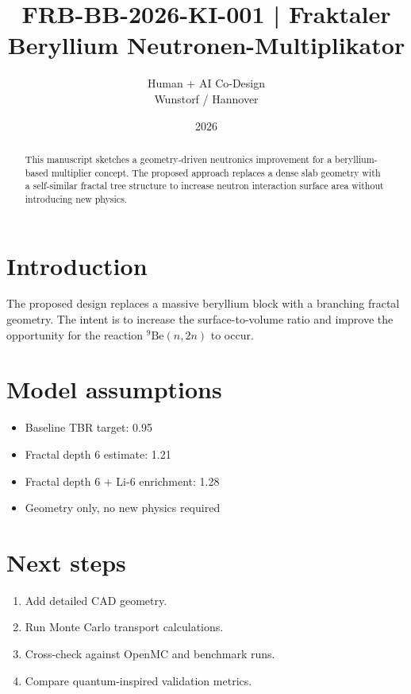 \documentclass[11pt]{article}
\title{FRB-BB-2026-KI-001 | Fraktaler Beryllium Neutronen-Multiplikator}
\author{Human + AI Co-Design\\Wunstorf / Hannover}
\date{2026}
\begin{document}
\maketitle

\begin{abstract}
This manuscript sketches a geometry-driven neutronics improvement for a beryllium-based multiplier concept. The proposed approach replaces a dense slab geometry with a self-similar fractal tree structure to increase neutron interaction surface area without introducing new physics.
\end{abstract}

\section{Introduction}
The proposed design replaces a massive beryllium block with a branching fractal geometry. The intent is to increase the surface-to-volume ratio and improve the opportunity for the reaction \(^{9}\mathrm{Be}(n,2n)\) to occur.

\section{Model assumptions}
\begin{itemize}
    \item Baseline TBR target: 0.95
    \item Fractal depth 6 estimate: 1.21
    \item Fractal depth 6 + Li-6 enrichment: 1.28
    \item Geometry only, no new physics required
\end{itemize}

\section{Next steps}
\begin{enumerate}
    \item Add detailed CAD geometry.
    \item Run Monte Carlo transport calculations.
    \item Cross-check against OpenMC and benchmark runs.
    \item Compare quantum-inspired validation metrics.
\end{enumerate}
\end{document}
